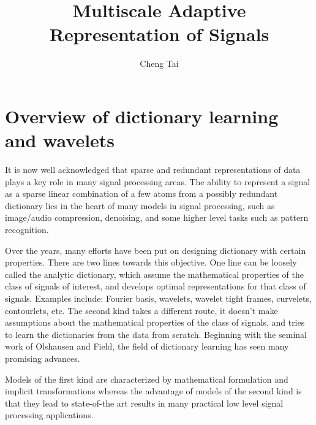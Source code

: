 \documentclass[a4paper]{article}
\begin{document}
\newtheorem{lem}{Lemma}
\newtheorem{prop}{Proposition}
\renewcommand{\a}{\mathbf{a}}
\renewcommand{\v}{\mathbf{v}}
\title{Multiscale Adaptive Representation of Signals}
\author{Cheng Tai}
\date{}
\maketitle
{}

\newpage
\section{Overview of dictionary learning and wavelets}
It is now well acknowledged that sparse and redundant representations of data plays a key role in many signal processing areas. The ability to represent a signal as a sparse linear combination of a few atoms from a possibly redundant dictionary lies in the heart of many models in signal processing, such as image/audio compression, denoising, and some higher level tasks such as pattern recognition.

Over the years, many efforts have been put on designing dictionary with certain properties. There are two lines towards this objective.  One line can be loosely called the analytic dictionary, which assume the mathematical properties of the class of signals of interest, and develops optimal representations for that class of signals. Examples include: Fourier basis, wavelets, wavelet tight frames, curvelets, contourlets, etc. The second kind takes a different route, it doesn't make assumptions about the mathematical properties of the class of signals, and tries to learn the dictionaries from the data from scratch. Beginning with the seminal work of Olshausen and Field, the field of dictionary learning has seen many promising advances. 

Models of the first kind are characterized by mathematical formulation and implicit transformations whereas the advantage of models of the second kind is that they lead to state-of-the art results in many practical low level signal processing applications. 
\end{document}
